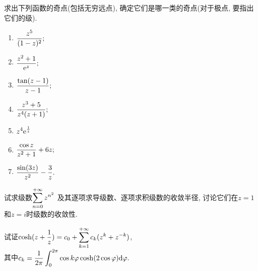 \begin{yyEx}
	求出下列函数的奇点(包括无穷远点), 确定它们是哪一类的奇点(对于极点, 要指出它们的级).
	\begin{enumerate}
		\item $\begin{lgathered}
			\frac{z^5}{(1-z)^2};
		\end{lgathered}$
		
		\item $\begin{lgathered}
		\frac{z^2+1}{\mathrm{e}^z};
		\end{lgathered}$
		
		\item $\begin{lgathered}
		\frac{\tan(z-1)}{z-1};
		\end{lgathered}$
		
		\item $\begin{lgathered}
		\frac{z^3+5}{z^4(z+1)};
		\end{lgathered}$
		
		\item $\begin{lgathered}
		z^4\mathrm{e}^{\frac{1}{z}}
		\end{lgathered}$
		
		\item $\begin{lgathered}
		\frac{\cos z}{z^2+1}+6z;
		\end{lgathered}$
		
		\item $\begin{lgathered}
		\frac{\sin(3z)}{z^2} - \frac{3}{z}.
		\end{lgathered}$
	\end{enumerate}
\end{yyEx}

\begin{yyEx}
	试求级数$\begin{lgathered}
		\sum_{n=0}^{+\infty}z^{n^2}
	\end{lgathered}$ 及其逐项求导级数、逐项求积级数的收敛半径, 讨论它们在$z = 1$和$z = i$时级数的收敛性.
\end{yyEx}

\begin{yyEx}
	试证$\begin{lgathered}
		\cosh(z+\frac{1}{z}) = c_0 + \sum_{k=1}^{+\infty}c_k(z^k+z^{-k})
	\end{lgathered}$, \\其中$\begin{lgathered}
		c_k = \frac{1}{2\pi}\int_{0}^{2\pi}\cos k\varphi\cosh(2\cos\varphi)\mathrm{d}\varphi.
	\end{lgathered}$
\end{yyEx}

